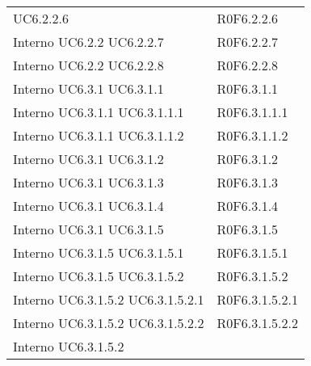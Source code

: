 \begin{longtable}{p{2.5cm}!{\VRule[1pt]}p{2.5cm}}
 \newline UC6.2.2.6
 & R0F6.2.2.6 \\
Interno \newline UC6.2.2
 \newline UC6.2.2.7
 & R0F6.2.2.7 \\
Interno \newline UC6.2.2
 \newline UC6.2.2.8
 & R0F6.2.2.8 \\
Interno \newline UC6.3.1
 \newline UC6.3.1.1
 & R0F6.3.1.1 \\
Interno \newline UC6.3.1.1
 \newline UC6.3.1.1.1
 & R0F6.3.1.1.1 \\
Interno \newline UC6.3.1.1
 \newline UC6.3.1.1.2
 & R0F6.3.1.1.2 \\
Interno \newline UC6.3.1
 \newline UC6.3.1.2
 & R0F6.3.1.2 \\
Interno \newline UC6.3.1
 \newline UC6.3.1.3
 & R0F6.3.1.3 \\
Interno \newline UC6.3.1
 \newline UC6.3.1.4
 & R0F6.3.1.4 \\
Interno \newline UC6.3.1
 \newline UC6.3.1.5
 & R0F6.3.1.5 \\
Interno \newline UC6.3.1.5
 \newline UC6.3.1.5.1
 & R0F6.3.1.5.1 \\
Interno \newline UC6.3.1.5
 \newline UC6.3.1.5.2
 & R0F6.3.1.5.2 \\
Interno \newline UC6.3.1.5.2
 \newline UC6.3.1.5.2.1
 & R0F6.3.1.5.2.1 \\
Interno \newline UC6.3.1.5.2
 \newline UC6.3.1.5.2.2
 & R0F6.3.1.5.2.2 \\
Interno \newline UC6.3.1.5.2

\end{longtable}

